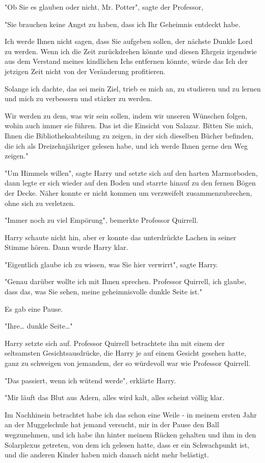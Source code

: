 {"Ob Sie es glauben oder nicht, Mr. Potter", sagte der Professor,

"Sie brauchen keine Angst zu haben, dass ich Ihr Geheimnis entdeckt habe.

Ich werde Ihnen nicht sagen, dass Sie aufgeben sollen, der nächste Dunkle Lord zu werden. Wenn ich die Zeit zurückdrehen könnte und diesen Ehrgeiz irgendwie aus dem Verstand meines kindlichen Ichs entfernen könnte, würde das Ich der jetzigen Zeit nicht von der Veränderung profitieren.

Solange ich dachte, das sei mein Ziel, trieb es mich an, zu studieren und zu lernen und mich zu verbessern und stärker zu werden.

Wir werden zu dem, was wir sein sollen, indem wir unseren Wünschen folgen, wohin auch immer sie führen. Das ist die Einsicht von Salazar. Bitten Sie mich, Ihnen die Bibliotheksabteilung zu zeigen, in der sich dieselben Bücher befinden, die ich als Dreizehnjähriger gelesen habe, und ich werde Ihnen gerne den Weg zeigen."

"Um Himmels willen", sagte Harry und setzte sich auf den harten Marmorboden, dann legte er sich wieder auf den Boden und starrte hinauf zu den fernen Bögen der Decke. Näher konnte er nicht kommen um verzweifelt zusammenzubrechen, ohne sich zu verletzen.

"Immer noch zu viel Empörung", bemerkte Professor Quirrell.

Harry schaute nicht hin, aber er konnte das unterdrückte Lachen in seiner Stimme hören. Dann wurde Harry klar.

"Eigentlich glaube ich zu wissen, was Sie hier verwirrt", sagte Harry.

"Genau darüber wollte ich mit Ihnen sprechen. Professor Quirrell, ich glaube, dass das, was Sie sehen, meine geheimnisvolle dunkle Seite ist."

Es gab eine Pause.

"Ihre… dunkle Seite…"

Harry setzte sich auf. Professor Quirrell betrachtete ihn mit einem der seltsamsten Gesichtsausdrücke, die Harry je auf einem Gesicht gesehen hatte, ganz zu schweigen von jemandem, der so würdevoll war wie Professor Quirrell.

"Das passiert, wenn ich wütend werde", erklärte Harry.

"Mir läuft das Blut aus Adern, alles wird kalt, alles scheint völlig klar.

Im Nachhinein betrachtet habe ich das schon eine Weile - in meinem ersten Jahr an der Muggelschule hat jemand versucht, mir in der Pause den Ball wegzunehmen, und ich habe ihn hinter meinem Rücken gehalten und ihm in den Solarplexus getreten, von dem ich gelesen hatte, dass er ein Schwachpunkt ist, und die anderen Kinder haben mich danach nicht mehr belästigt.

}
